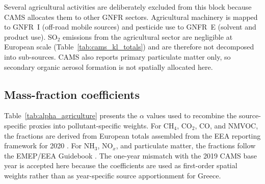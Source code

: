 Several agricultural activities are deliberately excluded from this
block because CAMS allocates them to other GNFR sectors. Agricultural
machinery is mapped to GNFR~I (off-road mobile sources) and pesticide
use to GNFR~E (solvent and product use). SO$_2$ emissions from the
agricultural sector are negligible at European scale
(Table~\ref{tab:cams_kl_totals}) and are therefore not decomposed into
sub-sources. CAMS also reports primary particulate matter only, so
secondary organic aerosol formation is not spatially allocated here.

\subsection{Mass-fraction coefficients}

Table~\ref{tab:alpha_agriculture} presents the $\alpha$ values used to
recombine the source-specific proxies into pollutant-specific weights.
For CH$_4$, CO$_2$, CO, and NMVOC, the fractions are derived from
European totals assembled from the EEA reporting framework for 2020
\citep{EEA_GHG_Emissions_2020}. For NH$_3$, NO$_x$, and particulate
matter, the fractions follow the EMEP/EEA Guidebook
\citep{EMEP_EEA}. The one-year mismatch with the 2019 CAMS base year is
accepted here because the coefficients are used as first-order spatial
weights rather than as year-specific source apportionment for Greece.

